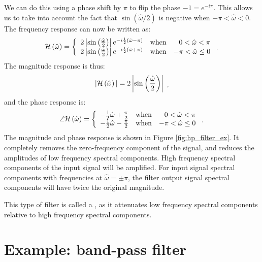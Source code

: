 \noindent We can do this using a phase shift by $\pi$ to flip the phase $-1 = e^{-i\pi}$. This allows us to take into account the fact that $\sin(\hat{\omega}/2)$ is negative when $-\pi < \hat{\omega} < 0$. The frequency response can now be written as:
\begin{equation}
\mathcal{H}\left(\hat{\omega}\right) = \left\{ 
  \begin{array}{llr}
    2\left|\sin\left(\frac{\hat{\omega}}{2}\right)\right|
    e^{-i\frac{1}{2}(\hat{\omega}-\pi)} & \mathrm{when} & 0
    < \hat{\omega} < \pi \\
    2\left|\sin\left(\frac{\hat{\omega}}{2}\right)\right|
    e^{-i\frac{1}{2}(\hat{\omega}+\pi)} & \mathrm{when} & -\pi
    < \hat{\omega} \le 0 \end{array} \,\, _.
\right.
\end{equation}
The magnitude response is thus:
\begin{equation}
|\mathcal{H}\left(\hat{\omega}\right)|=2\left|\sin\left(\frac{\hat{\omega}}{2}\right)\right| \,\, _,
\end{equation} 
and the phase response is:
\begin{equation}
\angle \mathcal{H}\left(\hat{\omega}\right) = \left\{ 
  \begin{array}{lcr}
    -\frac{1}{2}\hat{\omega} + \frac{\pi}{2}  & \mathrm{when} & 0 < \hat{\omega} < \pi \\
    -\frac{1}{2}\hat{\omega} - \frac{\pi}{2}  & \mathrm{when} & -\pi < \hat{\omega} \le 0 \\
  \end{array} \,\, _.
\right.
\end{equation}
The magnitude and phase response is shown in
Figure \ref{fig:hp_filter_ex}. It completely removes the zero-frequency
component of the signal, and reduces the amplitudes of low frequency
spectral components. High frequency spectral components of the input
signal will be amplified. For input signal spectral components with
frequencies at $\hat{\omega}=\pm \pi$, the filter output signal
spectral components will have twice the original magnitude.

This type of filter is called a \emph{}, as it attenuates low frequency spectral
components relative to high frequency spectral components.

\section{Example: band-pass filter}

